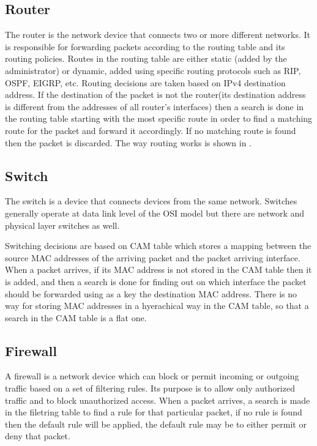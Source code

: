 \begin{itemize}
\subsection{Router}
\label{sub-sec:router}
The router is the network device that connects two or more different networks. It is responsible for forwarding packets according to the routing table and its routing policies. Routes in the routing table are either static (added by the administrator) or dynamic, added using specific routing protocols such as RIP, OSPF, EIGRP, etc.
Routing decisions are taken based on IPv4 destination address. If the destination of the packet is not the router(its destination address is different from the addresses of all router's interfaces) then a search is done in the routing table starting with the most specific route in order to find a matching route for the packet and forward it accordingly. If no matching route is found then the packet is discarded. The way routing works is shown in .
\subsection{Switch}
\label{sub-sec:switch}
The switch is a device that connects devices from the same network. Switches generally operate at data link level of the OSI model but there are network and physical layer switches as well. 

Switching decisions are based on CAM table which stores a mapping between the source MAC addresses of the arriving packet and the packet arriving interface. When a packet arrives, if its MAC address is not stored in the CAM table then it is added, and then a search is done for finding out on which interface the packet should be forwarded using as a key the destination MAC address. There is no way for storing MAC addresses in a hyerachical way in the CAM table, so that a search in the CAM table is a flat one.     
\subsection{Firewall}
\label{sub-sec:firewall}
A firewall is a network device which can block or permit incoming or outgoing traffic based on a set of filtering rules. Its purpose is to allow only authorized traffic and to block unauthorized access. When a packet arrives, a search is made in the filetring table to find a rule for that particular packet, if no rule is found then the default rule will be applied, the default rule may be to either permit or deny that packet. 


\end{itemize}
